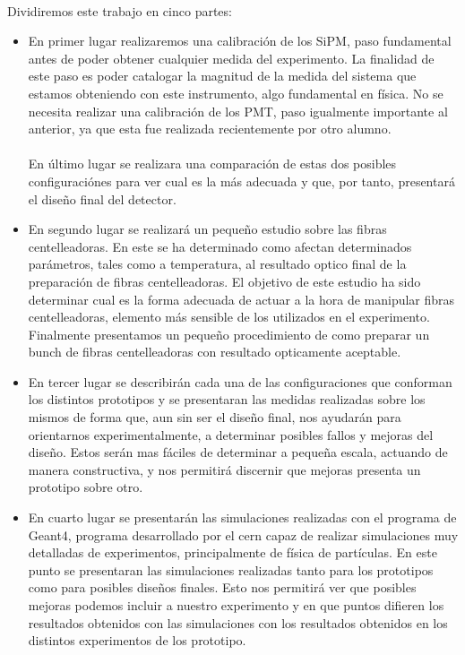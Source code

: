 \documentclass[11pt, a4paper]{article}
\begin{document}
\paragraph {}
Dividiremos este trabajo en cinco partes:
\begin{itemize}
\item{} En primer lugar realizaremos una calibración de los SiPM, paso fundamental antes de poder obtener cualquier medida del experimento. La finalidad de este paso es poder catalogar la magnitud de la medida del sistema que estamos obteniendo con este instrumento, algo fundamental en física. No se necesita realizar una calibración de los PMT, paso igualmente importante al anterior, ya que esta fue realizada recientemente por otro alumno. 

\paragraph {}
En último lugar se realizara una comparación de estas dos posibles configuraciónes para ver cual es la más adecuada y que, por tanto, presentará el diseño final del detector.

\item{} En segundo lugar se realizará un pequeño estudio sobre las fibras centelleadoras. En este se ha determinado como afectan determinados parámetros, tales como a temperatura, al resultado optico final de la preparación de fibras centelleadoras. El objetivo de este estudio ha sido determinar cual es la forma adecuada de actuar a la hora de manipular fibras centelleadoras, elemento más sensible de los utilizados en el experimento. Finalmente presentamos un pequeño procedimiento de como preparar un bunch de fibras centelleadoras con resultado opticamente aceptable.

\item{} En tercer lugar se describirán cada una de las configuraciones que conforman los distintos prototipos y se presentaran las medidas realizadas sobre los mismos de forma que, aun sin ser el diseño final, nos ayudarán para orientarnos experimentalmente, a determinar posibles fallos y mejoras del diseño. Estos serán mas fáciles de determinar a pequeña escala, actuando de manera constructiva, y nos permitirá discernir que mejoras presenta un prototipo sobre otro. 

\item{} En cuarto lugar se presentarán las simulaciones realizadas con el programa de Geant4, programa desarrollado por el cern capaz de realizar simulaciones muy detalladas de experimentos, principalmente de física de partículas. En este punto se presentaran las simulaciones realizadas tanto para los prototipos como para posibles diseños finales. Esto nos permitirá ver que posibles mejoras podemos incluir a nuestro experimento y en que puntos difieren los resultados obtenidos con las simulaciones con los resultados obtenidos en los distintos experimentos de los prototipo.


\end{itemize}
\end{document}
